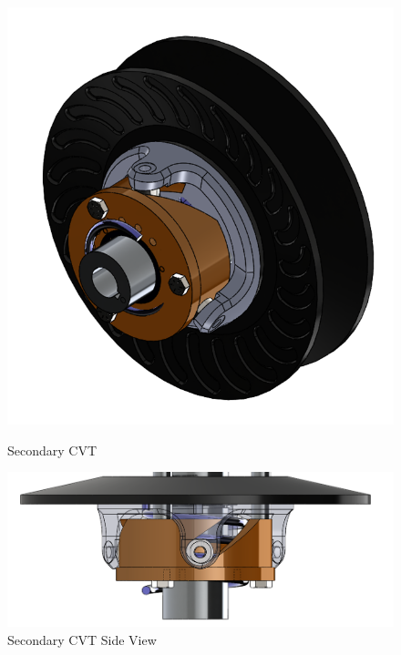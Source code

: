 \documentclass[12pt]{article}
\begin{document}
\begin{figure}[H]
  \begin{center}
      \begin{minipage}{0.45\textwidth}
          \includegraphics[scale=0.5]{secondaryCVT.png}
          \caption{Secondary CVT}
          \label{Fig_SecondaryCVT}
      \end{minipage}
      \hfill %
      \begin{minipage}{0.45\textwidth}
          \includegraphics[scale=0.5]{secondaryCVTSideView.png}
          \caption{Secondary CVT Side View}
          \label{Fig_SecondaryCVTSideView}
      \end{minipage}
  \end{center}
\end{figure}
\end{document}
